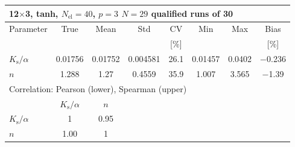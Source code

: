 \begin{tabular}{lccccccc}
\toprule
\multicolumn{8}{l}{12$\times$3, tanh, $N_{\mathrm{el}}=40$, $p=3$ \quad $N=29$ qualified runs of 30} \\
\midrule
Parameter & True & Mean & Std & CV & Min & Max & Bias \\
 &  &  &  & [\%] &  &  & [\%] \\
\midrule
  $K_{\mathrm{s}}/\alpha$ & \num{0.01756} & \num{0.01752} & \num{0.004581} & \num{26.1} & \num{0.01457} & \num{0.0402} & \num[retain-explicit-plus]{-0.236} \\
  $n$ & \num{1.288} & \num{1.27} & \num{0.4559} & \num{35.9} & \num{1.007} & \num{3.565} & \num[retain-explicit-plus]{-1.39} \\
\midrule
\multicolumn{8}{l}{Correlation: Pearson (lower), Spearman (upper)} \\
 & $K_{\mathrm{s}}/\alpha$ & $n$ &  &  &  &  &  \\
  $K_{\mathrm{s}}/\alpha$ & 1 & \num{0.95} &  &  &  &  &  \\
  $n$ & \num{1.00} & 1 &  &  &  &  &  \\
\bottomrule
\end{tabular}
